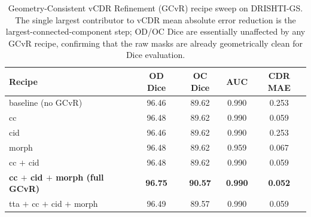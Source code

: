 \begin{table}[t]
\centering
\caption{Geometry-Consistent vCDR Refinement (GCvR) recipe sweep on DRISHTI-GS.
The single largest contributor to vCDR mean absolute error reduction is the
largest-connected-component step; OD/OC Dice are essentially unaffected by
any GCvR recipe, confirming that the raw masks are already geometrically clean
for Dice evaluation.}
\label{tab:gcvr}
\setlength{\tabcolsep}{8pt}
\renewcommand{\arraystretch}{1.15}
\begin{tabular}{lcccc}
\toprule
\textbf{Recipe} & \textbf{OD Dice} & \textbf{OC Dice} & \textbf{AUC} & \textbf{CDR MAE} \\
\midrule
baseline (no GCvR)                          & 96.46 & 89.62 & 0.990 & 0.253 \\
cc                                          & 96.48 & 89.62 & 0.990 & 0.059 \\
cid                                         & 96.46 & 89.62 & 0.990 & 0.253 \\
morph                                       & 96.48 & 89.62 & 0.959 & 0.067 \\
cc $+$ cid                                  & 96.48 & 89.62 & 0.990 & 0.059 \\
\rowcolor{ourrow}
\textbf{\textcolor{ourbold}{cc $+$ cid $+$ morph (full GCvR)}} & \textbf{96.75} & \textbf{90.57} & \textbf{0.990} & \textbf{0.052} \\
tta $+$ cc $+$ cid $+$ morph                & 96.49 & 89.57 & 0.990 & 0.059 \\
\bottomrule
\end{tabular}
\end{table}


